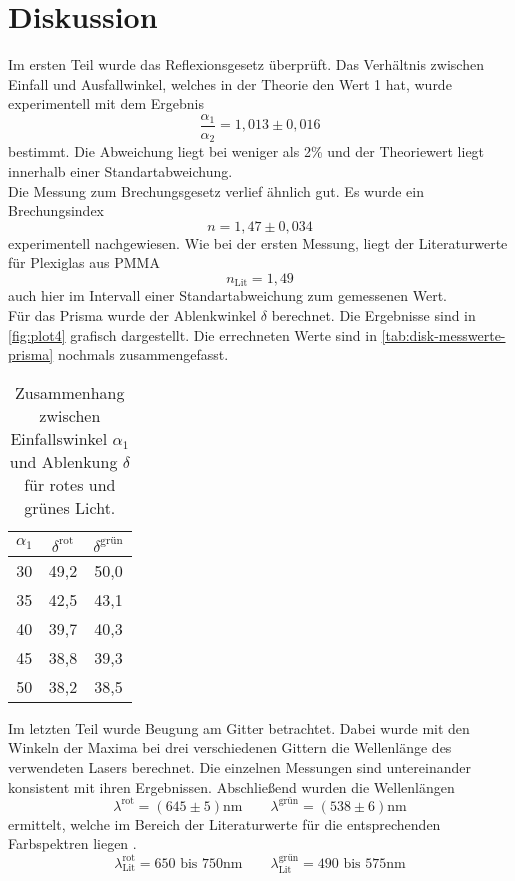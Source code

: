 \section{Diskussion}
\label{sec:Diskussion}
Im ersten Teil wurde das Reflexionsgesetz überprüft. Das Verhältnis zwischen Einfall und
Ausfallwinkel, welches in der Theorie den Wert 1 hat, wurde experimentell mit dem
Ergebnis
\begin{equation}
	\frac{\alpha_1}{\alpha_2} = 1,013 \pm 0,016
\end{equation}
bestimmt. Die Abweichung liegt bei weniger als 2\% und der Theoriewert liegt innerhalb
einer Standartabweichung.
\\
Die Messung zum Brechungsgesetz verlief ähnlich gut. Es wurde ein Brechungsindex 
\begin{equation}
	n = 1,47 \pm 0,034
\end{equation}
experimentell nachgewiesen. Wie bei der ersten Messung, liegt der Literaturwerte für
Plexiglas aus PMMA 
\begin{equation}
	n_\text{Lit} = 1,49
\end{equation}
auch hier im Intervall einer Standartabweichung zum gemessenen Wert.
\\
Für das Prisma wurde der Ablenkwinkel $\delta$ berechnet. Die Ergebnisse sind in
\autoref{fig:plot4} grafisch dargestellt. Die errechneten Werte sind in 
\autoref{tab:disk-messwerte-prisma} nochmals zusammengefasst.
\begin{table}[H]
	\centering
	\caption{Zusammenhang zwischen Einfallswinkel $\alpha_1$ und Ablenkung $\delta$
	für rotes und grünes Licht.}
	\label{tab:disk-messwerte-prisma}
	\begin{tabular}{c c c}
		\toprule
		$\alpha_1$ &
		$\delta^\text{rot}$ &
		$\delta^\text{grün}$ \\
		\midrule
		30 & 49,2 & 50,0	\\
		35 & 42,5 & 43,1	\\
		40 & 39,7 & 40,3	\\
		45 & 38,8 & 39,3	\\
		50 & 38,2 & 38,5	\\
		\bottomrule
	\end{tabular}
\end{table}
\noindent
Im letzten Teil wurde Beugung am Gitter betrachtet. Dabei wurde mit den Winkeln der Maxima
bei drei verschiedenen Gittern die Wellenlänge des verwendeten Lasers berechnet. Die
einzelnen Messungen sind untereinander konsistent mit ihren Ergebnissen. Abschließend
wurden die Wellenlängen
\[
	\lambda^\text{rot} = (645 \pm 5) \si{\nano\meter}
	\qquad
	\lambda^\text{grün} = (538 \pm 6) \si{\nano\meter}
\] 
ermittelt, welche im Bereich der Literaturwerte für die entsprechenden Farbspektren liegen
\cite{frustfrei}.
\begin{equation}
	\lambda_\text{Lit}^\text{rot} = 650 \text{ bis } 750 \si{\nano\meter}
	\qquad
	\lambda_\text{Lit}^\text{grün} = 490 \text{ bis } 575 \si{\nano\meter}
\end{equation}

